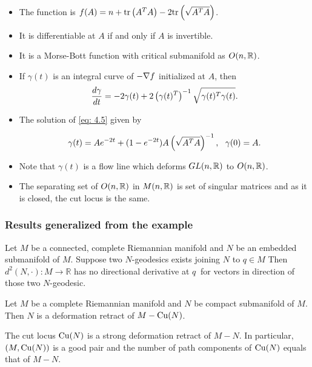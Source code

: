 \documentclass{beamer}
\begin{document}
	\begin{frame}
		\begin{itemize}[<+-| alert@+>]
			   \item The function is $f(A) = n + \mathrm{tr}\left( A^TA \right) - 2\mathrm{tr}\left( \sqrt{A^TA} \right)$.
			   \item It is differentiable at $A$ if and only if $A$ is invertible.
			   \item It is a Morse-Bott function with critical submanifold as $O(n,\mathbb{R})$.
			   \item If $\gamma(t)$ is an integral curve of $-\nabla f$ initialized at $A$, then 
	   			\begin{equation}
	   				\dfrac{d\gamma}{dt} = -2\gamma(t)+2\left( \gamma(t)^T \right)^{-1}\sqrt{\gamma(t)^T\gamma(t)} \label{eq: 4.5}.
	   			\end{equation}
			    \item The solution of \eqref{eq: 4.5} given by
			
			\begin{equation}\label{eq: 4.6}
			\gamma(t) = Ae^{-2t} + (1-e^{-2t})A\left( \sqrt{A^TA} \right)^{-1},~~\gamma(0)=A.
			\end{equation} 
			   \item Note that $\gamma(t)$ is a flow line which deforms $GL(n,\mathbb{R})$ to $O(n,\mathbb{R})$.
			   \item The separating set of $O(n,\mathbb{R})$ in $M(n,\mathbb{R})$ is set of singular matrices and as it is closed, the cut locus is the same.
		\end{itemize}
	\end{frame}	

	\begin{frame}
		\frametitle<presentation>{Results generalized from the example}
		\begin{theorem}
			\p Let $M$ be a connected, \p complete Riemannian manifold \p and $N$ be an embedded submanifold of $M$. \p Suppose two  $N$-geodesics exists joining $N$ to $q\in M$ \p Then $d^2(N,\cdot):M\to \mathbb{R}$ has no directional derivative at $q~$ \p for vectors in direction of those two $N$-geodesic. 
		\end{theorem}
		
		\p 
		\begin{theorem}
			Let $M$ be a complete Riemannian manifold \p and $N$ be compact submanifold of $M$. \p Then $N$ is a deformation retract of $M-\mathrm{Cu}(N)$.
		\end{theorem}

		\p 
		\begin{theorem}
			The cut locus $\mathrm{Cu}(N)$ is a strong deformation retract of $M-N$. \p In particular, $(M,\mathrm{Cu}(N))$ is a good pair \p and the number of path components of $\mathrm{Cu}(N)$ equals that of $M-N$.
		\end{theorem}
	\end{frame}	
\end{document}
